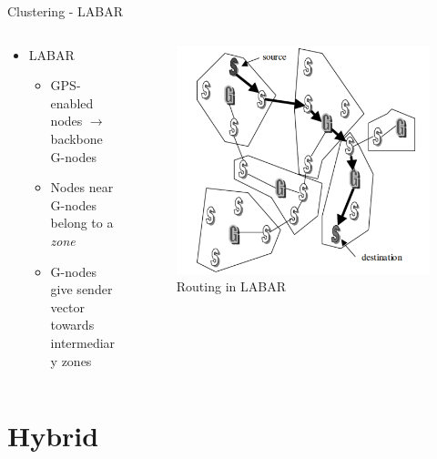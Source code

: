 \documentclass[pdftex]{beamer}
\begin{document}
\begin{frame}{Clustering - LABAR}
\begin{columns}
\begin{column}{.5\textwidth}
\begin{itemize}
	\item LABAR \cite{Zaruba2003}
		\begin{itemize}
			\item GPS-enabled nodes $\rightarrow$ backbone G-nodes
			\item Nodes near G-nodes belong to a \emph{zone}
			\item G-nodes give sender vector towards intermediary zones
		\end{itemize}
\end{itemize}
\end{column}

\begin{column}{.5\textwidth}
\begin{figure}
\includegraphics[width=\textwidth]{labar}
\caption{Routing in LABAR}
\end{figure}
\end{column}
\end{columns}
\end{frame}


\section{Hybrid}
\end{document}
